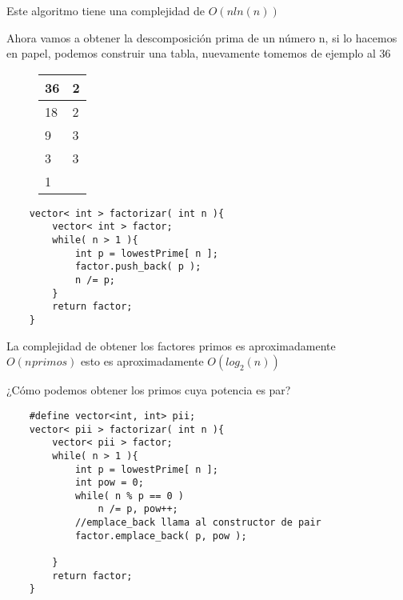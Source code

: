 Este algoritmo tiene una complejidad de $O(nln(n))$

Ahora vamos a obtener la descomposición prima de un número n, si lo hacemos en papel, podemos construir una tabla, nuevamente tomemos de ejemplo al 36
\begin{figure}[H]
    \begin{longtable}[c]{|l|l|}
    \hline
    \rowcolor[HTML]{C0C0C0} 
    {\color[HTML]{333333} 36} & {\color[HTML]{333333} 2} \\ \hline
    \endfirsthead
    \endhead
    \rowcolor[HTML]{FFFFFF} 
    18 & {\color[HTML]{333333} 2} \\ \hline
    \rowcolor[HTML]{FFFFFF} 
    9 & 3 \\ \hline
    \rowcolor[HTML]{FFFFFF} 
    3 & 3 \\ \hline
    \rowcolor[HTML]{FFFFFF} 
    1 &  \\ \hline
    \end{longtable}
\end{figure}

\begin{lstlisting}
    vector< int > factorizar( int n ){
        vector< int > factor;
        while( n > 1 ){
            int p = lowestPrime[ n ];
            factor.push_back( p );
            n /= p;
        }
        return factor;
    }
\end{lstlisting}

La complejidad de obtener los factores primos es aproximadamente $O( n_{}primos )$ esto es aproximadamente $O(log_{2}(n))$ \newline

¿Cómo podemos obtener los primos cuya potencia es par?

\begin{lstlisting}
    #define vector<int, int> pii;
    vector< pii > factorizar( int n ){
        vector< pii > factor;
        while( n > 1 ){
            int p = lowestPrime[ n ];
            int pow = 0;
            while( n % p == 0 )
                n /= p, pow++;
            //emplace_back llama al constructor de pair
            factor.emplace_back( p, pow );
            
        }
        return factor;
    }
\end{lstlisting}

